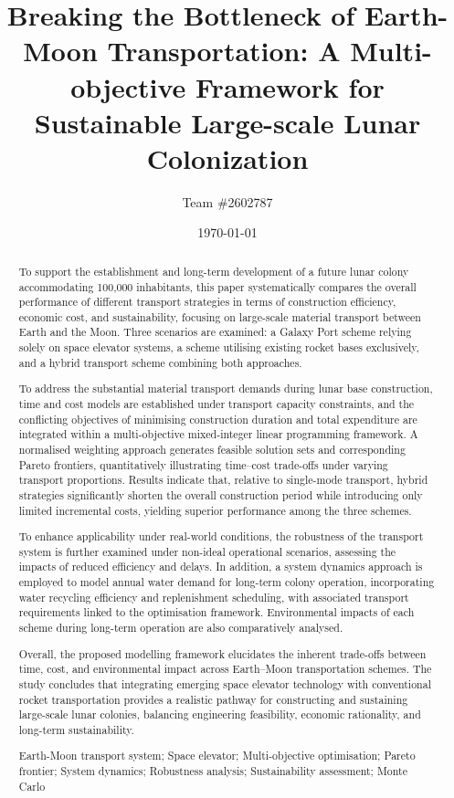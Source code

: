 \documentclass[12pt]{mcmthesis}
\title{Breaking the Bottleneck of Earth-Moon Transportation:
A Multi-objective Framework for Sustainable Large-scale Lunar Colonization}
\author{Team \#2602787}
\date{\today}
\begin{document}
\begin{abstract}
    \hspace{1.2em} To support the establishment and long-term development of a future lunar colony accommodating 100,000 inhabitants, this paper systematically compares the overall performance of different transport strategies in terms of construction efficiency, economic cost, and sustainability, focusing on large-scale material transport between Earth and the Moon. Three scenarios are examined: a Galaxy Port scheme relying solely on space elevator systems, a scheme utilising existing rocket bases exclusively, and a hybrid transport scheme combining both approaches.

    To address the substantial material transport demands during lunar base construction, time and cost models are established under transport capacity constraints, and the conflicting objectives of minimising construction duration and total expenditure are integrated within a multi-objective mixed-integer linear programming framework. A normalised weighting approach generates feasible solution sets and corresponding Pareto frontiers, quantitatively illustrating time--cost trade-offs under varying transport proportions. Results indicate that, relative to single-mode transport, hybrid strategies significantly shorten the overall construction period while introducing only limited incremental costs, yielding superior performance among the three schemes.

    To enhance applicability under real-world conditions, the robustness of the transport system is further examined under non-ideal operational scenarios, assessing the impacts of reduced efficiency and delays. In addition, a system dynamics approach is employed to model annual water demand for long-term colony operation, incorporating water recycling efficiency and replenishment scheduling, with associated transport requirements linked to the optimisation framework. Environmental impacts of each scheme during long-term operation are also comparatively analysed.

    Overall, the proposed modelling framework elucidates the inherent trade-offs between time, cost, and environmental impact across Earth--Moon transportation schemes. The study concludes that integrating emerging space elevator technology with conventional rocket transportation provides a realistic pathway for constructing and sustaining large-scale lunar colonies, balancing engineering feasibility, economic rationality, and long-term sustainability.

    \begin{keywords}
        Earth-Moon transport system; Space elevator; Multi-objective optimisation; Pareto frontier; System dynamics; Robustness analysis; Sustainability assessment; Monte Carlo
    \end{keywords}
\end{abstract}
\end{document}
